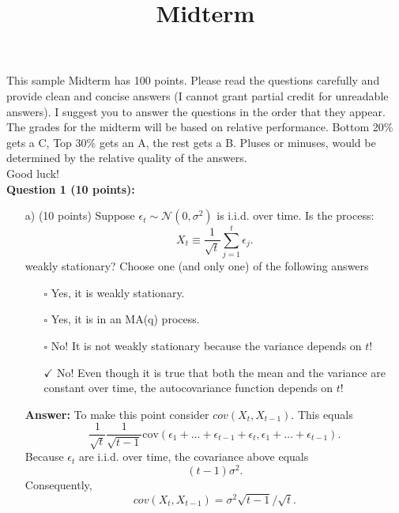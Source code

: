 \documentclass[12] {article}
\begin{document}
\onehalfspace

\title{Midterm}
\maketitle

This sample Midterm has 100 points. Please read the questions carefully and provide clean and concise answers (I cannot grant partial credit for unreadable answers). I suggest you to answer the questions in the order that they appear.  \\

The grades for the midterm will be based on relative performance. Bottom 20\% gets a C, Top 30\% gets an A, the rest gets a B. Pluses or minuses, would be determined by the relative quality of the answers. \\

Good luck!\\





\noindent \textbf{Question 1 (10 points):} \\ 

\begin{itemize}
\item [a)] (10 points) Suppose $\epsilon_t \sim \mathcal{N}(0,\sigma^2)$ is i.i.d. over time. Is the process:
\[X_t \equiv \frac{1}{\sqrt{t}} \sum_{j=1}^{t} \epsilon_j. \]
weakly stationary? Choose one (and only one) of the following answers

\begin{itemize}
\item [$\square$] Yes, it is weakly stationary. 
\item [$\square$] Yes, it is in an MA(q) process.
\item [$\square$] No! It is not weakly stationary because the variance depends on $t$!
\item [$\checkmark$] No! Even though it is true that both the mean and the variance are constant over time, the autocovariance function depends on $t$! 
\end{itemize}

\noindent \textbf{Answer:} To make this point consider $cov(X_{t},X_{t-1})$. This equals
\[ \frac{1}{\sqrt{t}}\frac{1}{\sqrt{t-1}} \textrm{cov} ( \epsilon_1 + \ldots + \epsilon_{t-1} + \epsilon_t,  \epsilon_1 + \ldots + \epsilon_{t-1}). \]
Because $\epsilon_{t}$ are i.i.d. over time, the covariance above equals
\[ (t-1) \sigma^2.\]
Consequently,
\[ cov(X_{t},X_{t-1}) = \sigma^2 \sqrt{t-1}/\sqrt{t}. \]








\end{itemize}
\end{document}
